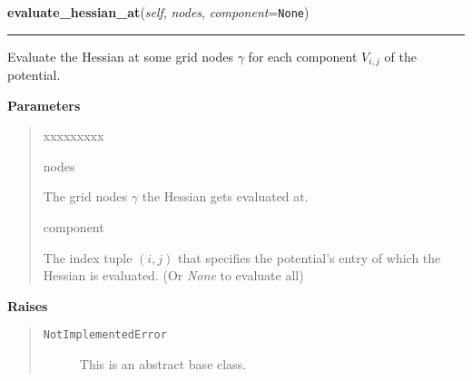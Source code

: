 \hspace{.8\funcindent}\begin{boxedminipage}{\funcwidth}

    \raggedright \textbf{evaluate\_hessian\_at}(\textit{self}, \textit{nodes}, \textit{component}={\tt None})

    \vspace{-1.5ex}

    \rule{\textwidth}{0.5\fboxrule}
\setlength{\parskip}{2ex}
    Evaluate the Hessian at some grid nodes $\gamma$ for
    each component $V_{i,j}$ of the potential.

\setlength{\parskip}{1ex}
      \textbf{Parameters}
      \vspace{-1ex}

      \begin{quote}
        \begin{Ventry}{xxxxxxxxx}

          \item[nodes]

          The grid nodes $\gamma$ the Hessian gets
          evaluated at.

          \item[component]

          The index tuple $\left(i,j \right)$ that specifies
          the potential's entry of which the Hessian is evaluated. (Or
          \textit{None} to evaluate all)

        \end{Ventry}

      \end{quote}

      \textbf{Raises}
    \vspace{-1ex}

      \begin{quote}
        \begin{description}

          \item[\texttt{NotImplementedError}]

          This is an abstract base class.

        \end{description}

      \end{quote}

    \end{boxedminipage}

    \label{MatrixPotential:MatrixPotential:calculate_local_quadratic}

